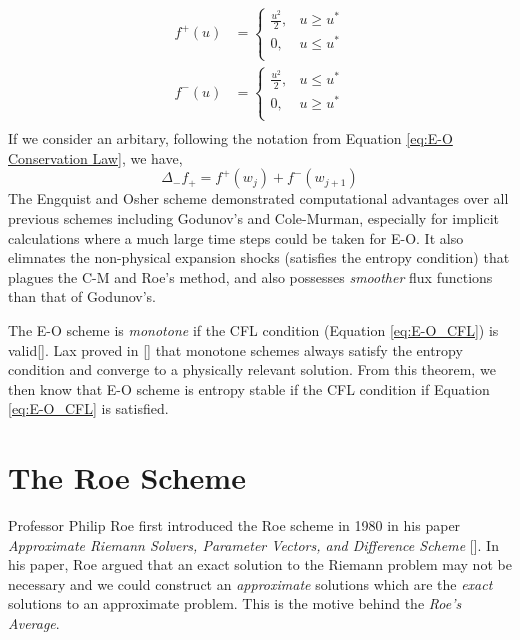 \documentclass[a4paper]{article}
\numberwithin{equation}{section}
\begin{document}
\begin{equation}
    \begin{split}
        f^+ (u) &= 
        \begin{cases}
            \frac{u^2}{2}, & u \geq u^*\\
            0, & u \leq u^*\\
        \end{cases}\\
        f^-(u) &= 
        \begin{cases}
            \frac{u^2}{2}, & u \leq u^* \\
            0, & u \geq u^*\\
        \end{cases}\\
    \end{split}
\end{equation}
If we consider an arbitary, following the notation from Equation \ref{eq:E-O Conservation Law}, we have, 
\begin{equation}
    \Delta_- f_+ = f^+(w_j) + f^-({w_{j+1}})
\end{equation}
The Engquist and Osher scheme demonstrated computational advantages over all previous schemes including Godunov's and Cole-Murman, especially for implicit calculations where a much large time steps could be taken for E-O. It also elimnates the non-physical expansion shocks (satisfies the entropy condition) that plagues the C-M and Roe's method, and also possesses \textit{smoother} flux functions than that of Godunov's.

The E-O scheme is \textit{monotone} if the CFL condition (Equation \ref{eq:E-O_CFL}) is valid[]. Lax proved in [] that monotone schemes always satisfy the entropy condition and converge to a physically relevant solution. From this theorem, we then know that E-O scheme is entropy stable if the CFL condition if Equation \ref{eq:E-O_CFL} is satisfied.

\section{The Roe Scheme}
Professor Philip Roe first introduced the Roe scheme in 1980 in his paper \textit{Approximate Riemann Solvers, Parameter Vectors, and Difference Scheme} []. In his paper, Roe argued that an exact solution to the Riemann problem may not be necessary and we could construct an \textit{approximate} solutions which are the \textit{exact} solutions to an approximate problem. This is the motive behind the \textit{Roe's Average}. 
\end{document}
